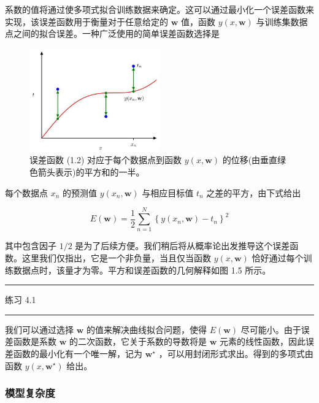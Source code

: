 \documentclass[10pt]{article}
\newcommand{\HRule}{\begin{center}\rule{0.9\linewidth}{0.2mm}\end{center}}
\begin{document}
系数的值将通过使多项式拟合训练数据来确定。这可以通过最小化一个误差函数来实现，该误差函数用于衡量对于任意给定的 \(\mathbf{w}\) 值，函数 \(y\left( {x,\mathbf{w}}\right)\) 与训练集数据点之间的拟合误差。一种广泛使用的简单误差函数选择是
\begin{figure}[!htb]
\begin{center}
\includegraphics[max width=0.5\textwidth]{images/0194e279-9b28-703a-88f4-c3ac21e2010d_28_873_342_686_544_0.jpg}
\caption{误差函数 (1.2) 对应于每个数据点到函数 \(y\left( {x,\mathbf{w}}\right)\) 的位移(由垂直绿色箭头表示)的平方和的一半。}
\end{center}
\end{figure}
\hspace*{3em} 



每个数据点 \({x}_{n}\) 的预测值 \(y\left( {{x}_{n},\mathbf{w}}\right)\) 与相应目标值 \({t}_{n}\) 之差的平方，由下式给出

\[
E\left( \mathbf{w}\right)  = \frac{1}{2}\mathop{\sum }\limits_{{n = 1}}^{N}{\left\{  y\left( {x}_{n},\mathbf{w}\right)  - {t}_{n}\right\}  }^{2} \tag{1.2}
\]

其中包含因子 \(1/2\) 是为了后续方便。我们稍后将从概率论出发推导这个误差函数。这里我们仅指出，它是一个非负量，当且仅当函数 \(y\left( {x,\mathbf{w}}\right)\) 恰好通过每个训练数据点时，该量才为零。平方和误差函数的几何解释如图 1.5 所示。

\HRule

练习 4.1

\HRule

我们可以通过选择 \(\mathbf{w}\) 的值来解决曲线拟合问题，使得 \(E\left( \mathbf{w}\right)\) 尽可能小。由于误差函数是系数 \(\mathbf{w}\) 的二次函数，它关于系数的导数将是 \(\mathbf{w}\) 元素的线性函数，因此误差函数的最小化有一个唯一解，记为 \({\mathbf{w}}^{ \star  }\) ，可以用封闭形式求出。得到的多项式由函数 \(y\left( {x,{\mathbf{w}}^{ \star  }}\right)\) 给出。



\subsubsection{模型复杂度}
\end{document}
